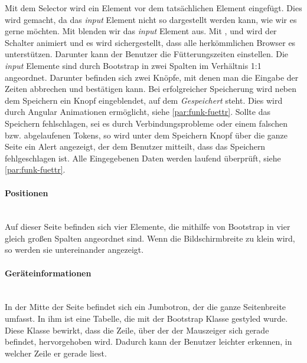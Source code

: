 Mit dem  Selector wird ein Element vor dem tatsächlichen Element eingefügt. Dies wird gemacht, da das \textit{input} Element nicht so dargestellt werden kann, wie wir es gerne möchten. Mit  blenden wir das \textit{input} Element aus. Mit ,  und  wird der Schalter animiert und es wird sichergestellt, dass alle herkömmlichen Browser es unterstützen. Darunter kann der Benutzer die Fütterungszeiten einstellen. Die \textit{input} Elemente sind durch Bootstrap in zwei Spalten im Verhältnis 1:1 angeordnet. Darunter befinden sich zwei Knöpfe, mit denen man die Eingabe der Zeiten abbrechen und bestätigen kann. Bei erfolgreicher Speicherung wird neben dem Speichern ein Knopf eingeblendet, auf dem \textit{Gespeichert} steht. Dies wird durch Angular Animationen ermöglicht, siehe \autoref{par:funk-fuettr}. Sollte das Speichern fehlschlagen, sei es durch Verbindungsprobleme oder einem falschen bzw. abgelaufenen Tokens, so wird unter dem Speichern Knopf über die ganze Seite ein Alert angezeigt, der dem Benutzer mitteilt, dass das Speichern fehlgeschlagen ist. Alle Eingegebenen Daten werden laufend überprüft, siehe \autoref{par:funk-fuettr}.

\paragraph*{Positionen}\mbox{}\\
Auf dieser Seite befinden sich vier Elemente, die mithilfe von Bootstrap in vier gleich großen Spalten angeordnet sind. Wenn die Bildschirmbreite zu klein wird, so werden sie untereinander angezeigt.

\paragraph*{Geräteinformationen}\mbox{}\\
In der Mitte der Seite befindet sich ein Jumbotron, der die ganze Seitenbreite umfasst. In ihm ist eine Tabelle, die mit der Bootstrap Klasse  gestyled wurde. Diese Klasse bewirkt, dass die Zeile, über der der Mauszeiger sich gerade befindet, hervorgehoben wird. Dadurch kann der Benutzer leichter erkennen, in welcher Zeile er gerade liest.


